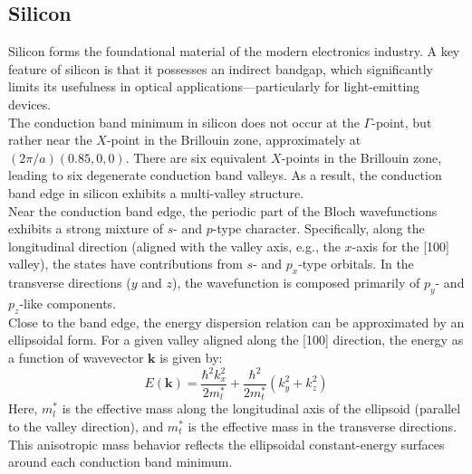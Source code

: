 \subsection{Silicon}
Silicon forms the foundational material of the modern electronics industry. A key feature of silicon is that it possesses an indirect bandgap, which significantly limits its usefulness in optical applications—particularly for light-emitting devices.\\
The conduction band minimum in silicon does not occur at the \( \Gamma \)-point, but rather near the \( X \)-point in the Brillouin zone, approximately at \( (2\pi/a)(0.85, 0, 0) \). There are six equivalent \( X \)-points in the Brillouin zone, leading to six degenerate conduction band valleys. As a result, the conduction band edge in silicon exhibits a multi-valley structure.\\
Near the conduction band edge, the periodic part of the Bloch wavefunctions exhibits a strong mixture of \( s \)- and \( p \)-type character. Specifically, along the longitudinal direction (aligned with the valley axis, e.g., the \( x \)-axis for the [100] valley), the states have contributions from \( s \)- and \( p_x \)-type orbitals. In the transverse directions (\( y \) and \( z \)), the wavefunction is composed primarily of \( p_y \)- and \( p_z \)-like components.\\
Close to the band edge, the energy dispersion relation can be approximated by an ellipsoidal form. For a given valley aligned along the [100] direction, the energy as a function of wavevector \( \mathbf{k} \) is given by:
\begin{equation}
E(\mathbf{k}) = \frac{\hbar^2 k_x^2}{2 m_l^*} + \frac{\hbar^2}{2 m_t^*} \left( k_y^2 + k_z^2 \right)
\end{equation}
\noindent
Here, \( m_l^* \) is the effective mass along the longitudinal axis of the ellipsoid (parallel to the valley direction), and \( m_t^* \) is the effective mass in the transverse directions. This anisotropic mass behavior reflects the ellipsoidal constant-energy surfaces around each conduction band minimum.
